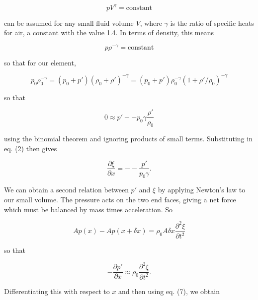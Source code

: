   \begin{equation*}p V^\gamma = \mathrm{constant} \tag{3}\end{equation*} 

  \noindent{}can be assumed for any small fluid volume $V$, where $\gamma$ is 
  the ratio of specific heats for air, a constant with the value 1.4. In terms 
  of density, this means 

  \begin{equation*}p \rho^{-\gamma} = \mathrm{constant} \tag{4}\end{equation*} 

  \noindent{}so that for our element, 

  \begin{equation*}p_0 \rho_0^{-\gamma} = (p_0 +p') (\rho_0 + \rho')^{-\gamma} 
  = (p_0 +p') \rho_0 ^{-\gamma} (1+ \rho'/\rho_0)^{-\gamma} 
  \tag{5}\end{equation*} 

  \noindent{}so that 

  \begin{equation*}0 \approx p' -- p_0 \gamma \frac{\rho'}{\rho_0} 
  \tag{6}\end{equation*} 

  \noindent{}using the binomial theorem and ignoring products of small terms. 
  Substituting in eq. (2) then gives 

  \begin{equation*}\frac{\partial \xi}{\partial x} = -- \frac{p'}{p_0 \gamma} . 
  \tag{7}\end{equation*} 

  We can obtain a second relation between $p'$ and $\xi$ by applying Newton's 
  law to our small volume. The pressure acts on the two end faces, giving a net 
  force which must be balanced by mass times acceleration. So 

  \begin{equation*}A p(x) -A p(x+ \delta x) = \rho_0 A \delta x 
  \frac{\partial^2 \xi}{\partial t^2} \tag{8}\end{equation*} 

  \noindent{}so that 

  \begin{equation*}- \frac{\partial p'}{\partial x} \approx \rho_0 
  \frac{\partial^2 \xi}{\partial t^2} . \tag{9}\end{equation*} 

  Differentiating this with respect to $x$ and then using eq. (7), we obtain 

